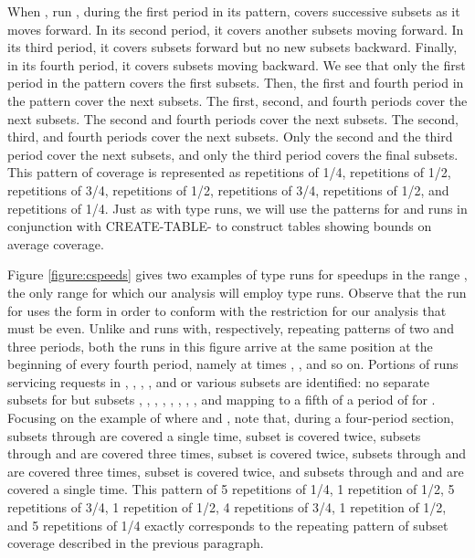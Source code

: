 \documentclass[11pt]{article}
\begin{document}
When , run , during the first period in its pattern, covers  successive subsets as it moves forward.  In its second period, it covers another  subsets moving forward.  In its third period, it covers  subsets forward but no new subsets backward.  Finally, in its fourth period, it covers  subsets moving backward.  We see that only the first period in the pattern covers the first  subsets.  Then, the first and fourth period in the pattern cover the next  subsets.  The first, second, and fourth periods cover the next  subsets.  The second and fourth periods cover the next  subsets.  The second, third, and fourth periods cover the next  subsets.  Only the second and the third period cover the next  subsets, and only the third period covers the final  subsets.  This pattern of coverage is represented as  repetitions of 1/4,  repetitions of 1/2,  repetitions of 3/4,  repetitions of 1/2,  repetitions of 3/4,  repetitions of 1/2, and  repetitions of 1/4.  Just as with type  runs, we will use the patterns for  and  runs in conjunction with CREATE-TABLE- to construct tables showing bounds on average coverage.

Figure \ref{figure:cspeeds} gives two examples of type  runs for speedups in the range , the only range for which our analysis will employ type  runs.  Observe that the run for  uses the form  in order to conform with the restriction for our analysis that  must be even.  Unlike  and  runs with, respectively, repeating patterns of two and three periods, both the runs in this figure arrive at the same position at the beginning of every fourth period, namely at times , , and so on.  Portions of runs servicing requests in , , , , and  or various subsets are identified: no separate subsets for  but subsets , , , , , , , , and  mapping to a fifth of a period of  for .  Focusing on the example of  where  and , note that, during a four-period section, subsets  through  are covered a single time, subset  is covered twice, subsets  through  and  are covered three times, subset  is covered twice, subsets  through  and  are covered three times, subset  is covered twice, and subsets  through  and  and  are covered a single time.  This pattern of 5 repetitions of 1/4, 1 repetition of 1/2, 5 repetitions of 3/4, 1 repetition of 1/2, 4 repetitions of 3/4, 1 repetition of 1/2, and 5 repetitions of 1/4 exactly corresponds to the repeating pattern of subset coverage described in the previous paragraph.
\end{document}
